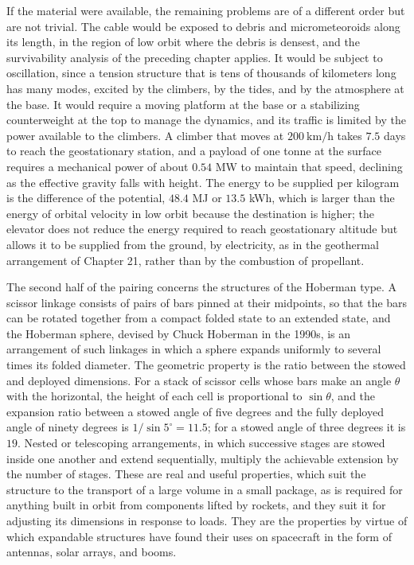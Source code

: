 If the material were available, the remaining problems are of a different order but are not trivial. The cable would be exposed to debris and micrometeoroids along its length, in the region of low orbit where the debris is densest, and the survivability analysis of the preceding chapter applies. It would be subject to oscillation, since a tension structure that is tens of thousands of kilometers long has many modes, excited by the climbers, by the tides, and by the atmosphere at the base. It would require a moving platform at the base or a stabilizing counterweight at the top to manage the dynamics, and its traffic is limited by the power available to the climbers. A climber that moves at $200\ \mathrm{km/h}$ takes $7.5$ days to reach the geostationary station, and a payload of one tonne at the surface requires a mechanical power of about $0.54$ MW to maintain that speed, declining as the effective gravity falls with height. The energy to be supplied per kilogram is the difference of the potential, $48.4$ MJ or $13.5$ kWh, which is larger than the energy of orbital velocity in low orbit because the destination is higher; the elevator does not reduce the energy required to reach geostationary altitude but allows it to be supplied from the ground, by electricity, as in the geothermal arrangement of Chapter 21, rather than by the combustion of propellant.

The second half of the pairing concerns the structures of the Hoberman type. A scissor linkage consists of pairs of bars pinned at their midpoints, so that the bars can be rotated together from a compact folded state to an extended state, and the Hoberman sphere, devised by Chuck Hoberman in the 1990s, is an arrangement of such linkages in which a sphere expands uniformly to several times its folded diameter. The geometric property is the ratio between the stowed and deployed dimensions. For a stack of scissor cells whose bars make an angle $\theta$ with the horizontal, the height of each cell is proportional to $\sin\theta$, and the expansion ratio between a stowed angle of five degrees and the fully deployed angle of ninety degrees is $1/\sin5^\circ=11.5$; for a stowed angle of three degrees it is $19$. Nested or telescoping arrangements, in which successive stages are stowed inside one another and extend sequentially, multiply the achievable extension by the number of stages. These are real and useful properties, which suit the structure to the transport of a large volume in a small package, as is required for anything built in orbit from components lifted by rockets, and they suit it for adjusting its dimensions in response to loads. They are the properties by virtue of which expandable structures have found their uses on spacecraft in the form of antennas, solar arrays, and booms.

